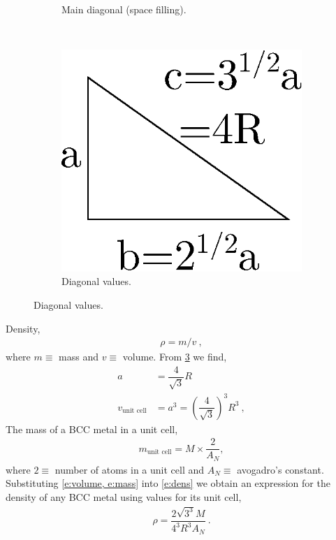 \documentclass[a4paper]{article}
\begin{document}
\begin{figure}
\begin{subfigure}[b]{0.3\linewidth}
				\caption{Main diagonal (space filling).}
				\label{sf:diag2}
			\end{subfigure}
			~
			\begin{subfigure}[b]{0.3\linewidth}
				\centering
				\includegraphics[width=\linewidth]{triag.eps}
				\caption{Diagonal values.}
				\label{sf:diag3}
			\end{subfigure}
			\label{f:diag}
		\end{figure}
		Density,
		\begin{align}
			\rho = m/v~, \label{e:dens}
		\end{align}
		where $m \equiv $ mass and $v \equiv $ volume. From \cref{f:diag} we find,
		\begin{align}
			a &= \dfrac{4}{\sqrt{3}} R \\
			v_{\textrm{unit cell}} &= a^{3} = \left(\dfrac{4}{\sqrt{3}}\right)^{3} R^{3}~, \label{e:volume}
		\end{align}
		The mass of a BCC metal in a unit cell, 
		\begin{align}
			m_{\textrm{unit cell}} = M \times \dfrac{2}{A_{N}}, \label{e:mass}
		\end{align} 
		where $2 \equiv $ number of atoms in a unit cell and $A_{N} \equiv $ avogadro's constant. Substituting \cref{e:volume, e:mass} into \cref{e:dens} we obtain an expression for the density of any BCC metal using values for its unit cell,
		\begin{align}
			\rho = \dfrac{2 \sqrt{3^{3}} M }{4^{3} R^{3} A_{N}}~.
		\end{align}
\end{document}
